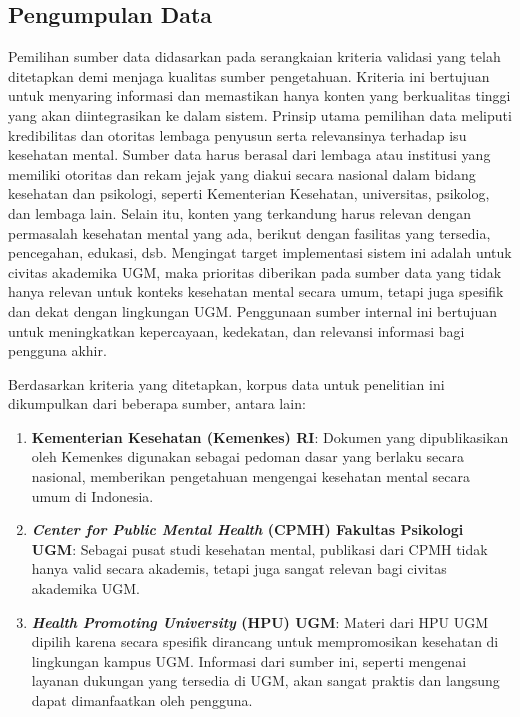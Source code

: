 \subsection{Pengumpulan Data}
Pemilihan sumber data didasarkan pada serangkaian kriteria validasi yang telah ditetapkan demi menjaga kualitas sumber pengetahuan.
Kriteria ini bertujuan untuk menyaring informasi dan memastikan hanya konten yang berkualitas tinggi yang akan diintegrasikan ke dalam sistem.
Prinsip utama pemilihan data meliputi kredibilitas dan otoritas lembaga penyusun serta relevansinya terhadap isu kesehatan mental.
Sumber data harus berasal dari lembaga atau institusi yang memiliki otoritas dan rekam jejak yang diakui secara nasional dalam bidang kesehatan dan psikologi, seperti Kementerian Kesehatan, universitas, psikolog, dan lembaga lain.
Selain itu, konten yang terkandung harus relevan dengan permasalah kesehatan mental yang ada, berikut dengan fasilitas yang tersedia, pencegahan, edukasi, dsb.
Mengingat target implementasi sistem ini adalah untuk civitas akademika UGM, maka prioritas diberikan pada sumber data yang tidak hanya relevan untuk konteks kesehatan mental secara umum, tetapi juga spesifik dan dekat dengan lingkungan UGM.
Penggunaan sumber internal ini bertujuan untuk meningkatkan kepercayaan, kedekatan, dan relevansi informasi bagi pengguna akhir.

Berdasarkan kriteria yang ditetapkan, korpus data untuk penelitian ini dikumpulkan dari beberapa sumber, antara lain:

\begin{enumerate}
	\item \textbf{Kementerian Kesehatan (Kemenkes) RI}: Dokumen yang dipublikasikan oleh Kemenkes digunakan sebagai pedoman dasar yang berlaku secara nasional, memberikan pengetahuan mengengai kesehatan mental secara umum di Indonesia.
	\item \textbf{\textit{Center for Public Mental Health} (CPMH) Fakultas Psikologi UGM}: Sebagai pusat studi kesehatan mental, publikasi dari CPMH tidak hanya valid secara akademis, tetapi juga sangat relevan bagi civitas akademika UGM.
	\item \textbf{\textit{Health Promoting University} (HPU) UGM}: Materi dari HPU UGM dipilih karena secara spesifik dirancang untuk mempromosikan kesehatan di lingkungan kampus UGM. Informasi dari sumber ini, seperti mengenai layanan dukungan yang tersedia di UGM, akan sangat praktis dan langsung dapat dimanfaatkan oleh pengguna.
\end{enumerate}


